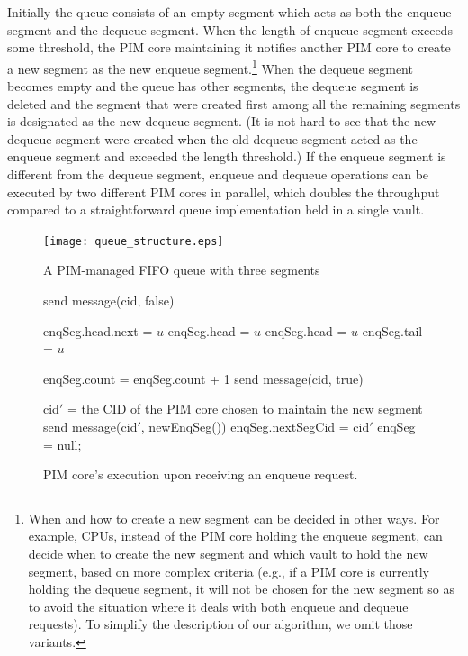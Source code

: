 Initially the queue consists of an empty segment which acts as both the enqueue segment and 
the dequeue segment. 
When the length of enqueue segment exceeds some threshold, the PIM core maintaining it
notifies another PIM core to create a new segment as the new enqueue segment.\footnote{
When and how to create a new segment can be decided in other ways.
For example, CPUs, instead of the PIM core holding the enqueue segment, 
can decide when to create the new segment and which vault to hold the new segment, 
based on more complex criteria 
(e.g., if a PIM core is currently holding the dequeue segment, it will not be chosen for 
the new segment so as to avoid the situation where it deals with both enqueue and dequeue requests).
To simplify the description of our algorithm, we omit those variants.}
When the dequeue segment becomes empty and the queue has other segments, 
the dequeue segment is deleted and the segment that were created first 
among all the remaining segments is designated as the new dequeue segment. 
(It is not hard to see that the new dequeue segment were created when the old dequeue segment 
acted as the enqueue segment and exceeded the length threshold.)
If the enqueue segment is different from the dequeue segment, 
enqueue and dequeue operations can be executed by two different PIM cores 
in parallel, which doubles the throughput compared to a straightforward queue implementation 
held in a single vault.  

\begin{figure}[ht!]
\centering
\texttt{[image: queue\_structure.eps]}
\caption{A PIM-managed FIFO queue with three segments}
\label{figure:queue_structure}
\end{figure}



\begin{figure}
\begin{algorithm}[H]
\Begin
{
    {
        send message(cid, false)\;
    }
    {
        {
            enqSeg.head.next = $u$\;
            enqSeg.head = $u$\;
        }
        {
            enqSeg.head = $u$\;
            enqSeg.tail = $u$\;
        }

        enqSeg.count = enqSeg.count + 1\;
        send message(cid, true)\;

        {
            cid$'$ = the CID of the PIM core chosen to maintain the new segment\;
            send message(cid$'$, newEnqSeg())\;
            enqSeg.nextSegCid = cid$'$\;
            enqSeg = null;
        }
    }
}
\end{algorithm}
\caption{PIM core's execution upon receiving an enqueue request.}
\label{figure:enq}
\end{figure}

